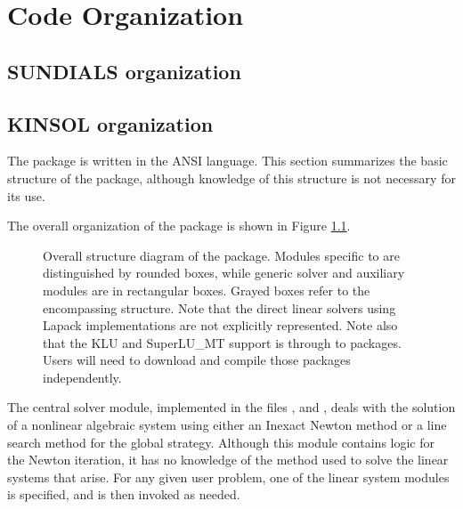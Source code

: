 \chapter{Code Organization}\label{s:organization}

\section{SUNDIALS organization}\label{ss:sun_org}


\section{KINSOL organization}\label{ss:kinsol_org}

The {\kinsol} package is written in the ANSI {\C} language. This section
summarizes the basic structure of the package, although knowledge
of this structure is not necessary for its use.

The overall organization of the {\kinsol} package is shown in Figure
\ref{f:kinorg}.
\begin{figure}[htb]
{\centerline{}}
\caption [Overall structure diagram of the KINSOL package]
{Overall structure diagram of the {\kinsol} package.
  Modules specific to {\kinsol} are distinguished by rounded boxes, while
  generic solver and auxiliary modules are in rectangular boxes.
  Grayed boxes refer to the encompassing {\sundials} structure.
  Note that the direct linear solvers using Lapack implementations are not 
  explicitly represented.  Note also that the KLU and SuperLU\_MT support is through
  to packages.  Users will need to download and compile those packages independently.}
\label{f:kinorg}
\end{figure}
The central solver module, implemented in the files
,  and , deals with the solution
of a nonlinear algebraic system using either an Inexact Newton method or a
line search method for the global strategy. Although this module contains logic
for the Newton iteration, it has no knowledge of the method used to solve the
linear systems that arise. For any given user problem, one of the linear system
modules is specified, and is then invoked as needed.

